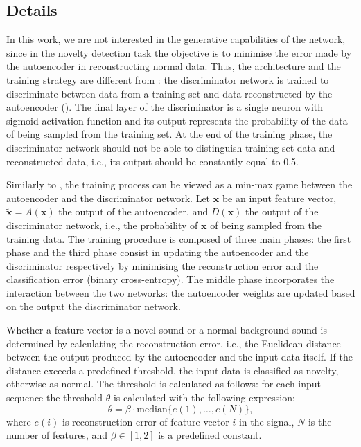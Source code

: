 \subsection{Details}
In this work, we are not interested in the generative capabilities of the network, since in the novelty detection task the objective is to minimise the error made by the autoencoder in reconstructing normal data. Thus, the architecture and the training strategy are different from \cite{makhzani2015adversarial}: the discriminator network is trained to discriminate between data from a training set and data reconstructed by the autoencoder (). The final layer of the discriminator is a single neuron with sigmoid activation function and its output represents the probability of the data of being sampled from the training set. At the end of the training phase, the discriminator network should not be able to distinguish training set data and reconstructed data, i.e., its output should be constantly equal to 0.5.

Similarly to \cite{goodfellow2014generative}, the training process can be viewed as a min-max game between the autoencoder and the discriminator network. Let $\boldsymbol{x}$ be an input feature vector, $\tilde{\boldsymbol{x}} = A(\boldsymbol{x})$ the output of the autoencoder, and $D(\boldsymbol{x})$ the output of the discriminator network, i.e., the probability of $\boldsymbol{x}$ of being sampled from the training data. The training procedure is composed of three main phases: the first phase and the third phase consist in updating the autoencoder and the discriminator respectively by minimising the reconstruction error and the classification error (binary cross-entropy). The middle phase incorporates the interaction between the two networks: the autoencoder weights are updated based on the output the discriminator network.


Whether a feature vector is a novel sound or a normal background sound is determined by calculating the reconstruction error, i.e., the Euclidean distance between the output produced by the autoencoder and the input data itself. If the distance exceeds a predefined threshold, the input data is classified as novelty, otherwise as normal. The threshold is calculated as follows: for each input sequence the threshold $\theta$ is calculated with the following expression:
\begin{equation}
\theta = \beta \cdot \text{median}\{e(1),\ldots,e(N)\},
\end{equation}
where $e(i)$ is reconstruction error of feature vector $i$ in the signal, $N$ is the number of features, and $\beta \in [1, 2]$ is a predefined constant.

